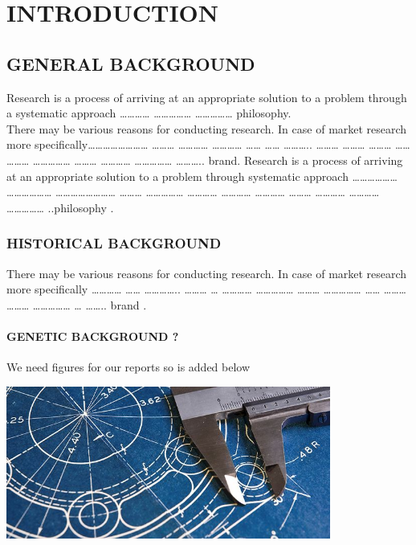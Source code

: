 \documentclass[12pt,a4paper]{report}
\begin{document}
\newpage

\chapter{INTRODUCTION}

\section{GENERAL BACKGROUND}

Research is a process of arriving at an appropriate solution to a problem through a systematic approach ………… …………… …………… 
philosophy. 
\\ %

There may be various reasons for conducting research. In case of market research more specifically…………………… ……… ………… ………… …… ……
……….. ……… ……… ……… …… ……… …………… ……… ………… ……………
……….. brand. Research is a process of arriving at an appropriate solution to a problem \cite{Dirac}
through systematic approach ……………… ……………… ……………………
……… …………… ………… ………… ………… ………
………… ………… ……………   ..philosophy \citep{mkgandhi}.
\subsection{HISTORICAL BACKGROUND}
 There may be various reasons for conducting research\cite{duncombe}. In case of market
research more specifically  \cite{bradshaw} ………… 
…… ………….. ……… … ………… …………… ………
…………… …… ……… ……… …………… … …….. brand \cite{andrews}.

\subsubsection{GENETIC BACKGROUND ?}
\lipsum[2-4]We need figures for our reports so  is added below\\ 

\begin{center}    
    \includegraphics[width=0.8\textwidth]{figures/somename}
    \label{fig:somelabe}
\end{center} 
\end{document}
